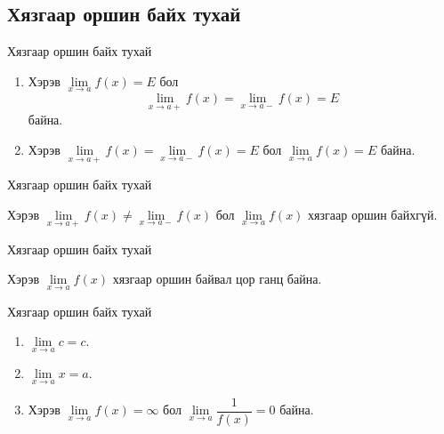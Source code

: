\subsection{Хязгаар оршин байх тухай}
\begin{frame}[allowframebreaks]{Хязгаар оршин байх тухай}
\begin{theorem}\label{casual and onesided limit}
\begin{enumerate}
\item Хэрэв $\lim\limits_{x\to a}f(x)=E$ бол $$\lim\limits_{x\to a+}f(x)=\lim\limits_{x\to a-}f(x)=E$$ байна.
\item Хэрэв $\lim\limits_{x\to a+}f(x)=\lim\limits_{x\to a-}f(x)=E$ бол $\lim\limits_{x\to a}f(x)=E$ байна.
\end{enumerate}
\end{theorem}
\end{frame}

\begin{frame}[allowframebreaks]{Хязгаар оршин байх тухай}
\begin{theorem}\label{no limit condition}
Хэрэв $\lim\limits_{x\to a+}f(x)\neq \lim\limits_{x\to a-}f(x)$ бол $\lim\limits_{x\to a}f(x)$ хязгаар оршин байхгүй.
\end{theorem}
\end{frame}

\begin{frame}[allowframebreaks]{Хязгаар оршин байх тухай}
\begin{theorem}\label{uniqlim}
Хэрэв $\lim\limits_{x\to a}f(x)$ хязгаар оршин байвал цор ганц байна.
\end{theorem}
\end{frame}

\begin{frame}[allowframebreaks]{Хязгаар оршин байх тухай}
\begin{theorem}\label{conslim}
\begin{enumerate}
\item $\lim\limits_{x\to a}c=c$.
\item $\lim\limits_{x\to a}x=a$.
\item Хэрэв $\lim\limits_{x\to a}f(x)=\infty$ бол $\lim\limits_{x\to a}\dfrac{1}{f(x)}=0$ байна.
\end{enumerate}
\end{theorem}
\end{frame}



